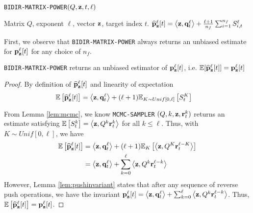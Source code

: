 \begin{algorithm}[ht]
\caption{\texttt{BIDIR-MATRIX-POWER}$(Q, \mathbf{z}, t,\ell)$}
\label{alg:linearsysest}
\begin{algorithmic}[1]
\REQUIRE Matrix $Q$, exponent $\ell$, vector $\mathbf{z}$, target index $t$.
\ENDFOR
\RETURN $\widehat{\mathbf{p}}_\mathbf{z}^{\ell}[t] = \left< \mathbf{z}, \mathbf{q}^{\ell}_t \right> + \frac{\ell+1}{n_f} \sum_{i=1}^{n_f}S_{i,t}^\ell$
\end{algorithmic}
\end{algorithm} 

First, we observe that \texttt{BIDIR-MATRIX-POWER} always returns an unbiased estimate for ${\mathbf{p}}_\mathbf{z}^{\ell}[t]$ for any choice of $n_f$.

\begin{lemma}
\label{lem:unbiased}
\texttt{BIDIR-MATRIX-POWER} returns an unbiased estimator of ${\mathbf{p}}_\mathbf{z}^{\ell}[t]$, i.e. $\mathbb{E}[\widehat{\mathbf{p}}_\mathbf{z}^{\ell}[t]] = {\mathbf{p}}_\mathbf{z}^{\ell}[t]$
\end{lemma}

\begin{proof}
By definition of $\widehat{\mathbf{p}}_\mathbf{z}^{\ell}[t]$ and linearity of expectation
\begin{align*}
\mathbb{E}\left[\widehat{\mathbf{p}}_\mathbf{z}^{\ell}[t]\right] 
&= \left<\mathbf{z}, \mathbf{q}_t^{\ell} \right> + (\ell+1)\mathbb{E}_{K \sim Unif[0, \ell]}\left[S_{t}^{K}\right]
\end{align*}

From Lemma \ref{lem:mcmc}, we know \texttt{MCMC-SAMPLER} $(Q, k, \mathbf{z}, \mathbf{r}^{k}_t)$ returns an estimate satisfying $\mathbb{E}\left[S_{t}^{k}\right] = \left< \mathbf{z}, Q^k \mathbf{r}^{k}_t \right>$ for all $k\leq \ell$. Thus, with $K \sim Unif[0, \ell]$, we have
\begin{align*}
\mathbb{E}\left[\widehat{\mathbf{p}}_\mathbf{z}^{\ell}[t] \right] &= \left<\mathbf{z}, \mathbf{q}_t^{\ell} \right> + (\ell+1)\mathbb{E}_K\left[\left< \mathbf{z}, Q^K \mathbf{r}_t^{\ell-K} \right> \right] \\
&= \left<\mathbf{z}, \mathbf{q}_t^{\ell} \right> + \sum_{k = 0}^\ell\left< \mathbf{z}, Q^k \mathbf{r}_t^{\ell-k} \right>
\end{align*}
However, Lemma \ref{lem:pushinvariant} states that after any sequence of reverse push operations, we have the invariant ${\mathbf{p}}_\mathbf{z}^{\ell}[t] = \left<\mathbf{z}, \mathbf{q}_t^{\ell} \right> + \sum_{k=0}^{\ell} \left<\mathbf{z}, Q^k\mathbf{r}_t^{\ell-k}\right>$. Thus, $\mathbb{E}\left[\widehat{\mathbf{p}}_\mathbf{z}^{\ell}[t] \right] = {\mathbf{p}}_\mathbf{z}^{\ell}[t]$.
\end{proof}

